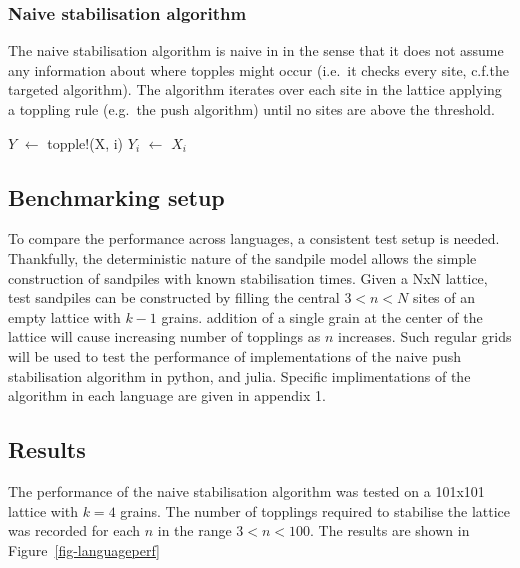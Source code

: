 \documentclass[
  letterpaper,
  DIV=11,
  numbers=noendperiod]{scrartcl}
\begin{document}
\subsubsection{Naive stabilisation
algorithm}\label{naive-stabilisation-algorithm}

The naive stabilisation algorithm is naive in in the sense that it does
not assume any information about where topples might occur (i.e.~it
checks every site, c.f.the targeted algorithm). The algorithm iterates
over each site in the lattice applying a toppling rule (e.g.~the push
algorithm) until no sites are above the threshold.

\begin{algorithm}[htb!]
\caption{Naive stabilisation algorithm}
\label{alg-naivestabilise}
\begin{algorithmic}[1]
          \State $Y$ $\gets$ topple!(X, i)
      \Else
          \State $Y_i$ $\gets$ $X_i$
      \EndIf 
  \EndFor
\EndWhile
\end{algorithmic}
\end{algorithm}

\subsection{Benchmarking setup}\label{benchmarking-setup}

To compare the performance across languages, a consistent test setup is
needed. Thankfully, the deterministic nature of the sandpile model
allows the simple construction of sandpiles with known stabilisation
times. Given a NxN lattice, test sandpiles can be constructed by filling
the central \(3 < n< N\) sites of an empty lattice with \(k-1\) grains.
addition of a single grain at the center of the lattice will cause
increasing number of topplings as \(n\) increases. Such regular grids
will be used to test the performance of implementations of the naive
push stabilisation algorithm in python, and julia. Specific
implimentations of the algorithm in each language are given in appendix
1.

\subsection{Results}\label{results}

The performance of the naive stabilisation algorithm was tested on a
101x101 lattice with \(k=4\) grains. The number of topplings required to
stabilise the lattice was recorded for each \(n\) in the range
\(3 < n < 100\). The results are shown in Figure~\ref{fig-languageperf}
\end{document}
